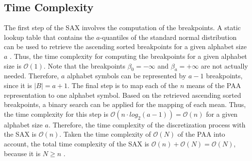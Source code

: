 \subsection*{Time Complexity}
The first step of the \ac{SAX} involves the computation of the breakpoints. A static lookup table that contains the $a$-quantiles of the standard normal distribution can be used to retrieve the ascending sorted breakpoints for a given alphabet size $a$ \cite{SAX_Lin}. Thus, the time complexity for computing the breakpoints for a given alphabet size is $\mathcal{O}(1)$. Note that the breakpoints $\beta_0 = -\infty$ and $\beta_a = +\infty$ are not actually needed. Therefore, $a$ alphabet symbols can be represented by $a-1$ breakpoints, since it is $|B| = a + 1$. \newline
The final step is to map each of the $n$ means of the \ac{PAA} representation to one alphabet symbol. Based on the retrieved ascending sorted breakpoints, a binary search can be applied for the mapping of each mean. Thus, the time complexity for this step is $\mathcal{O}(n \cdot log_{2}(a-1)) = \mathcal{O}(n)$ for a given alphabet size $a$. \newline
Therefore, the time complexity of the discretization process with the \ac{SAX} is $\mathcal{O}(n)$.
Taken the time complexity of $\mathcal{O}(N)$ of the \ac{PAA} into account, the total time complexity of the \ac{SAX} is $\mathcal{O}(n) + \mathcal{O}(N) = \mathcal{O}(N)$, because it is $N \geq n$ \cite{SFA}.